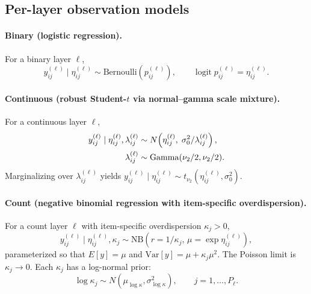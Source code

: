 \documentclass[11pt]{article}
\DeclareMathOperator{\logit}{logit}
\begin{document}
\subsection{Per-layer observation models}

\paragraph{Binary (logistic regression).}
For a binary layer $\ell$,
\begin{equation}
    y_{ij}^{(\ell)}\mid \eta_{ij}^{(\ell)}\sim\mathrm{Bernoulli}(p_{ij}^{(\ell)}),
    \qquad
    \logit p_{ij}^{(\ell)}=\eta_{ij}^{(\ell)}.
    \label{eq:lik-binary}
\end{equation}

\paragraph{Continuous (robust Student-$t$ via normal--gamma scale mixture).}
For a continuous layer $\ell$,
\begin{align}
    y_{ij}^{(\ell)}\mid \eta_{ij}^{(\ell)},\lambda_{ij}^{(\ell)}
    &\sim N\!\left(\eta_{ij}^{(\ell)},\;\sigma_0^2/\lambda_{ij}^{(\ell)}\right),
    \notag\\
    \lambda_{ij}^{(\ell)} &\sim\mathrm{Gamma}(\nu_2/2,\nu_2/2).
    \label{eq:lik-continuous}
\end{align}
Marginalizing over $\lambda_{ij}^{(\ell)}$ yields
$y_{ij}^{(\ell)}\mid\eta_{ij}^{(\ell)}\sim t_{\nu_2}(\eta_{ij}^{(\ell)},\sigma_0^2)$.

\paragraph{Count (negative binomial regression with item-specific overdispersion).}
For a count layer $\ell$ with item-specific overdispersion $\kappa_j>0$,
\begin{equation}
    y_{ij}^{(\ell)}\mid\eta_{ij}^{(\ell)},\kappa_j
    \sim\mathrm{NB}\!\left(r=1/\kappa_j,\,\mu=\exp\eta_{ij}^{(\ell)}\right),
    \label{eq:lik-count}
\end{equation}
parameterized so that $E[y]=\mu$ and $\mathrm{Var}[y]=\mu+\kappa_j\mu^2$.
The Poisson limit is $\kappa_j\to 0$.  Each $\kappa_j$ has a log-normal
prior:
\begin{equation}
    \log\kappa_j\sim N(\mu_{\log\kappa},\sigma_{\log\kappa}^2),
    \qquad j=1,\dots,P_\ell.
    \label{eq:kappa-prior}
\end{equation}
\end{document}
